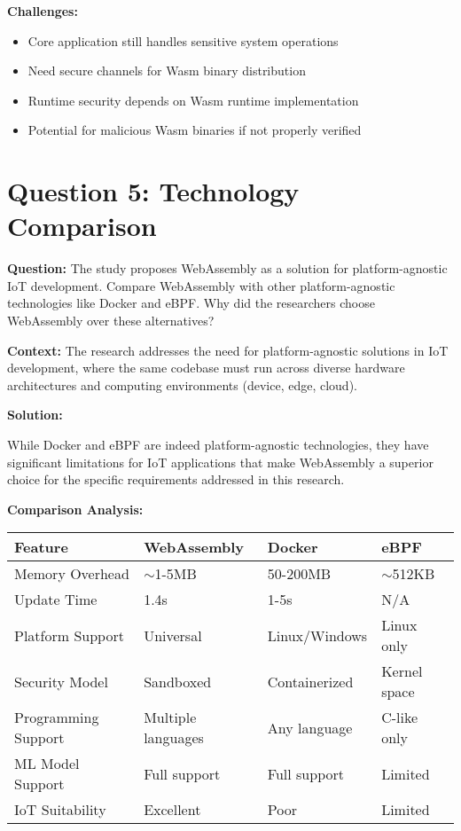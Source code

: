 \documentclass[11pt]{article}
\begin{document}
\textbf{Challenges:}
\begin{itemize}
\item Core application still handles sensitive system operations
\item Need secure channels for Wasm binary distribution
\item Runtime security depends on Wasm runtime implementation
\item Potential for malicious Wasm binaries if not properly verified
\end{itemize}

\newpage

\section*{Question 5: Technology Comparison}

\textbf{Question:} The study proposes WebAssembly as a solution for platform-agnostic IoT development. Compare WebAssembly with other platform-agnostic technologies like Docker and eBPF. Why did the researchers choose WebAssembly over these alternatives?

\textbf{Context:} The research addresses the need for platform-agnostic solutions in IoT development, where the same codebase must run across diverse hardware architectures and computing environments (device, edge, cloud).

\textbf{Solution:}

While Docker and eBPF are indeed platform-agnostic technologies, they have significant limitations for IoT applications that make WebAssembly a superior choice for the specific requirements addressed in this research.

\textbf{Comparison Analysis:}

\begin{center}
\begin{tabular}{|l|p{3cm}|p{3cm}|p{3cm}|}
\hline
\textbf{Feature} & \textbf{WebAssembly} & \textbf{Docker} & \textbf{eBPF} \\
\hline
Memory Overhead & $\sim$1-5MB & 50-200MB & $\sim$512KB \\
\hline
Update Time & 1.4s & 1-5s & N/A \\
\hline
Platform Support & Universal & Linux/Windows & Linux only \\
\hline
Security Model & Sandboxed & Containerized & Kernel space \\
\hline
Programming Support & Multiple languages & Any language & C-like only \\
\hline
ML Model Support & Full support & Full support & Limited \\
\hline
IoT Suitability & Excellent & Poor & Limited \\
\hline
\end{tabular}
\end{center}
\end{document}
